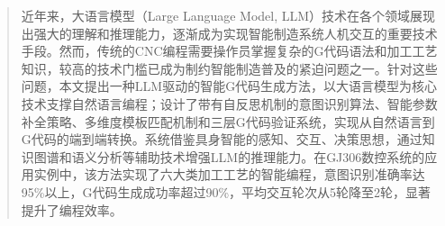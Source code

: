 \documentclass[preprint,12pt]{elsarticle}
\begin{document}
\begin{frontmatter}
\address[sict]{Shenyang Institute of Computing Technology, Chinese Academy of Sciences,
            Shenyang 110168, 
            PR China}


\address[casnc]{Shenyang CASNC Technology Co., Ltd.,
            Shenyang 110168, 
            PR China}










\begin{abstract}
近年来，大语言模型（Large Language Model, LLM）技术在各个领域展现出强大的理解和推理能力，逐渐成为实现智能制造系统人机交互的重要技术手段。然而，传统的CNC编程需要操作员掌握复杂的G代码语法和加工工艺知识，较高的技术门槛已成为制约智能制造普及的紧迫问题之一。针对这些问题，本文提出一种LLM驱动的智能G代码生成方法，以大语言模型为核心技术支撑自然语言编程；设计了带有自反思机制的意图识别算法、智能参数补全策略、多维度模板匹配机制和三层G代码验证系统，实现从自然语言到G代码的端到端转换。系统借鉴具身智能的感知、交互、决策思想，通过知识图谱和语义分析等辅助技术增强LLM的推理能力。在GJ306数控系统的应用实例中，该方法实现了六大类加工工艺的智能编程，意图识别准确率达95\%以上，G代码生成成功率超过90\%，平均交互轮次从5轮降至2轮，显著提升了编程效率。
\end{abstract}


\end{frontmatter}
\end{document}

